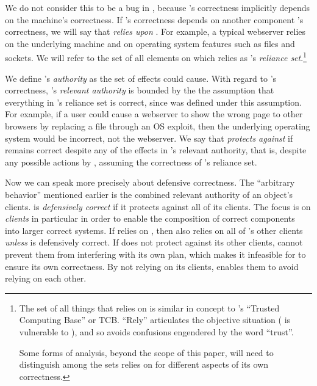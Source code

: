 \documentclass{llncs}
\begin{document}
We do not consider this to be a bug in , because 's
correctness implicitly depends on the machine's correctness.  If
's correctness depends on another component 's
correctness, we will say that  \emph{relies upon} .
For example, a typical webserver relies on the underlying machine and
on operating system features such as files and sockets.  We will refer
to the set of all elements on which  relies as 's
\emph{reliance set}.\footnote{
%
     The set of all things that  relies on is similar in
     concept to 's ``Trusted Computing Base'' or TCB. ``Rely''
     articulates the objective situation ( is vulnerable to
     ), and so avoids confusions engendered by the word
     ``trust''.
     
     Some forms of analysis, beyond the scope of this paper, will need
     to distinguish among the sets  relies on for different
     aspects of its own correctness.}

We define 's \emph{authority} as the set of effects 
could cause.  With regard to 's correctness, 's
\emph{relevant authority} is bounded by the the assumption that
everything in 's reliance set is correct, since  was
defined under this assumption. For example, if a user could cause a
webserver to show the wrong page to other browsers by replacing a file
through an OS exploit, then the underlying operating system would be
incorrect, not the webserver. We say that  \emph{protects
against}  if  remains correct despite any of the
effects in 's relevant authority, that is, despite any
possible actions by , assuming the correctness of 's
reliance set.

Now we can speak more precisely about defensive correctness. The
``arbitrary behavior'' mentioned earlier is the combined relevant
authority of an object's clients.  is \emph{defensively
correct} if it protects against all of its clients.  The focus is on
\emph{clients} in particular in order to enable the composition of
correct components into larger correct systems. If  relies on
, then  also relies on all of 's other clients
\emph{unless}  is defensively correct.  If  does not
protect against its other clients,  cannot prevent them from
interfering with its own plan, which makes it infeasible for 
to ensure its own correctness.  By not relying on its clients,
 enables them to avoid relying on each other.
\end{document}
